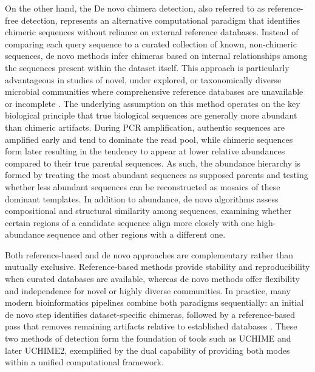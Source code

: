 On the other hand, the De novo chimera detection, also referred to as reference-free detection, represents an alternative computational paradigm that identifies chimeric sequences without reliance on external reference databases. Instead of comparing each query sequence to a curated collection of known, non-chimeric sequences, de novo methods infer chimeras based on internal relationships among the sequences present within the dataset itself. This approach is particularly advantageous in studies of novel, under explored, or taxonomically diverse microbial communities where comprehensive reference databases are unavailable or incomplete \citep{Edgar2011,Edgar2016}. The underlying assumption on this method operates on the key biological principle that true biological sequences are generally more abundant than chimeric artifacts. During PCR amplification, authentic sequences are amplified early and tend to dominate the read pool, while chimeric sequences form later resulting in the tendency to appear at lower relative abundances compared to their true parental sequences. As such, the abundance hierarchy is formed by treating the most abundant sequences as supposed parents and testing whether less abundant sequences can be reconstructed as mosaics of these dominant templates. In addition to abundance, de novo algorithms assess compositional and structural similarity among sequences, examining whether certain regions of a candidate sequence align more closely with one high-abundance sequence and other regions with a different one.

Both reference-based and de novo approaches are complementary rather than mutually exclusive. Reference-based methods provide stability and reproducibility when curated databases are available, whereas de novo methods offer flexibility and independence for novel or highly diverse communities. In practice, many modern bioinformatics pipelines combine both paradigms sequentially: an initial de novo step identifies dataset-specific chimeras, followed by a reference-based pass that removes remaining artifacts relative to established databases \citep{Edgar2016}. These two methods of detection form the foundation of tools such as UCHIME and later UCHIME2, exemplified by the dual capability of providing both modes within a unified computational framework.

